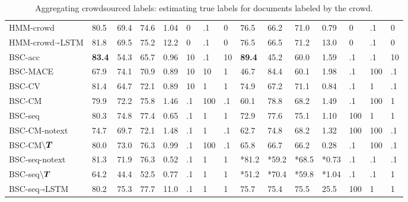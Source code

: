 \begin{table}
\begin{tabularx}{\textwidth}{p{3.05cm} X X X X P{0.27cm} P{0.27cm} P{0.27cm} X X X X P{0.27cm}  P{0.27cm}  P{0.27cm} }
HMM-crowd & 80.5 & 69.4 & 74.6 & %
1.04 & 0 & .1 & 0 & 76.5 & 66.2 & 71.0 & %
0.79 & 0 & .1 & 0 \\ 
HMM-crowd$\Arrow{0.2cm}$LSTM & 81.8 & 69.5 & 75.2 & %
12.2 & 0 & .1 & 0 & 76.5 & 66.5 & 71.2 & %
13.0 & 0 & .1 & 0\\ 
\midrule
BSC-acc & \textbf{83.4} & 54.3 & 65.7 & %
0.96 & 10 & .1 & 10 & \textbf{89.4} & 45.2 & 60.0 & %
1.59 & .1 & .1 & 10 \\ 
BSC-MACE & 67.9 & 74.1 & 70.9 & %
0.89 & 10 & 10 & 1 & 46.7 & 84.4 & 60.1 & %
 1.98 & .1 & 100 & .1\\ 
BSC-CV & 81.4 & 64.7 & 72.1 & %
0.89 & 10 & 1 & 1 & 74.9 & 67.2 & 71.1 & %
 0.84 & .1 & 1 & .1\\ 
BSC-CM & 79.9 & 72.2 & 75.8 & %
1.46 & .1 & 100 & .1 & 60.1 & 78.8 & 68.2 & %
1.49 & .1 & 100 & 1 \\ 
BSC-seq & 80.3 & 74.8 & 77.4 & %
0.65 & .1 & 1 & 1 & 
72.9 & 77.6 & 75.1 & %
1.10 & 100 & 1 & 1\\ \midrule
BSC-CM-notext & 74.7 & 69.7 & 72.1 & 1.48 & .1 & 1 & .1 & 62.7 & 74.8 & 68.2 & 1.32 & 100 & 100 & .1 \\
BSC-CM$\backslash\boldsymbol T$ & 80.0 & 73.0 & 76.3 & 0.99 & .1 & 100 & .1 & 65.8 & 66.7 & 66.2 & 0.28 & .1 & 100 & .1  \\
BSC-seq-notext & 81.3 & 71.9 & 76.3 & 0.52 & .1 & 1 & 1 & *81.2 & *59.2 & *68.5 & *0.73 & .1 & .1 & .1\\ 
BSC-seq$\backslash\boldsymbol T$ & 64.2 & 44.4 & 52.5 & 0.77 & .1 & 1 & 1 & *51.2 & *70.4 & *59.8 & *1.04 & .1 & .1 & 1\\\midrule
BSC-seq$\Arrow{0.2cm}$LSTM & %
80.2 & 75.3 & 77.7 & 11.0 
& .1 & 1 & 1 & 
75.7 & 75.4 & 75.5 & %
25.5 & 100 & 1 & 1\\ 
\bottomrule
\end{tabularx}
\caption{Aggregating crowdsourced labels: estimating true labels for documents labeled by the crowd.}
\label{tab:aggregation_results}
\npnoround
\end{table}
